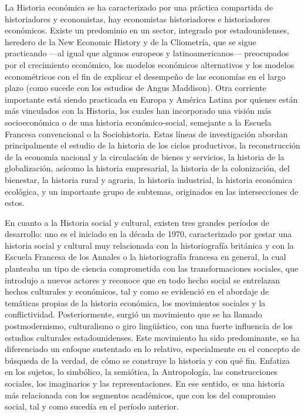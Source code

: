 La Historia económica se ha caracterizado por una práctica compartida de
historiadores y economistas, hay economistas historiadores e historiadores
económicos. Existe un predominio en un sector, integrado por
estadounidenses, heredero de la New Economic History y de la Cliometría,
que se sigue practicando ---al igual que algunos europeos y latinoamericanos---
preocupados por el crecimiento económico, los modelos económicos
alternativos y los modelos econométricos con el fin de explicar el
desempeño de las economías en el largo plazo (como sucede con los estudios
de Angus Maddison). Otra corriente importante está siendo practicada en
Europa y América Latina por quienes están más vinculados con la Historia,
los cuales han incorporado una visión más socioeconómica o de una historia
económico-social, semejante a la Escuela Francesa convencional o la
Sociohistoria. Estas líneas de investigación abordan principalmente el estudio
de la historia de los ciclos productivos, la reconstrucción de la
economía nacional y la circulación de bienes y servicios, la historia de la
globalización, así\linebreak como la historia empresarial, la historia de la colonización, del
bienestar, la historia rural y agraria, la historia industrial, la historia
económica ecológica, y un importante grupo de subtemas, originados en las
intersecciones de estos.

En cuanto a la Historia social y cultural, existen tres grandes períodos de
desarrollo: uno es el iniciado en la década de 1970, caracterizado por
gestar una historia social y cultural muy relacionada con la historiografía
británica y con la Escuela Francesa de los Annales o la historiografía
francesa en general, la cual planteaba un tipo de ciencia comprometida con
las transformaciones sociales, que introdujo a nuevos actores y reconoce
que en todo hecho social se entrelazan hechos culturales y económicos, tal
y como se evidenció en el abordaje de temáticas propias de la historia
económica, los movimientos sociales y la conflictividad. Posteriormente,
surgió un movimiento que se ha llamado postmodernismo, culturalismo o giro
lingüístico, con una fuerte influencia de los estudios culturales
estadounidenses. Este movimiento ha sido predominante, se ha diferenciado
un enfoque sustentado en lo relativo, especialmente en el concepto de
búsqueda de la verdad, de cómo se construye la historia y con qué fin.
Enfatiza en los sujetos, lo simbólico, la semiótica, la Antropología, las
construcciones sociales, los imaginarios y las representaciones. En ese
sentido, es una historia más relacionada con los segmentos académicos, que
con los del compromiso social, tal y como sucedía en el período anterior.

